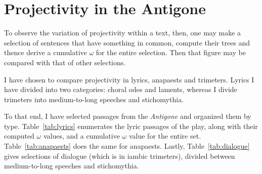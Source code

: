 \documentclass{article}
\newcommand{\FN}{\mathsf}
\begin{document}
\section{Projectivity in the Antigone}

To observe the variation of projectivity within a text, then, one may make a
selection of sentences that have something in common, compute their trees and
thence derive a cumulative \ensuremath{\FN{\omega}} for the entire selection. Then that figure
may be compared with that of other selections.

I have chosen to compare projectivity in lyrics, anapaests and trimeters. Lyrics
I have divided into two categories: choral odes and laments, whereas I divide
trimeters into medium-to-long speeches and stichomythia.

To that end, I have selected passages from the \emph{Antigone} and organized
them by type. Table~\ref{tab:lyrics} enumerates the lyric passages of the play,
along with their computed \ensuremath{\FN{\omega}} values, and a cumulative \ensuremath{\FN{\omega}} value for the
entire set. Table~\ref{tab:anapaests} does the same for anapaests. Lastly,
Table~\ref{tab:dialogue} gives selections of dialogue (which is in iambic
trimeters), divided between medium-to-long speeches and stichomythia.
\end{document}
